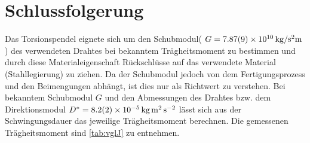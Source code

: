 
\section{Schlussfolgerung}

























Das Torsionspendel eignete sich um den Schubmodul( $G =\SI{7.87+-0.09e10}{kg \per \second \squared  \metre}$) des verwendeten Drahtes bei bekanntem Trägheitsmoment zu bestimmen und durch diese Materialeigenschaft Rückschlüsse auf das verwendete Material (Stahllegierung) zu ziehen. Da der Schubmodul jedoch von dem Fertigungsprozess und den Beimengungen abhängt, ist dies nur als Richtwert zu verstehen. Bei bekanntem Schubmodul $G$ und den Abmessungen des Drahtes bzw. dem Direktionsmodul $D^*=\SI{8.2+-0.2e-5}{\kilogram \metre \squared \per \second \squared }$  lässt sich aus der Schwingungsdauer das jeweilige Trägheitsmoment berechnen.  Die gemessenen  Trägheitsmoment  sind \cref{tab:vglJ} zu entnehmen.








